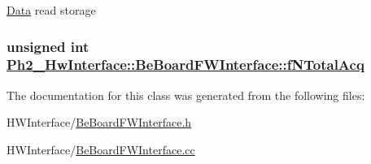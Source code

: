 \hyperlink{class_ph2___hw_interface_1_1_data}{Data} read storage \hypertarget{class_ph2___hw_interface_1_1_be_board_f_w_interface_9cc80365ec331732245553a8bc0024ab}{
\subsubsection[fNTotalAcq]{\setlength{\rightskip}{0pt plus 5cm}unsigned int \hyperlink{class_ph2___hw_interface_1_1_be_board_f_w_interface_9cc80365ec331732245553a8bc0024ab}{Ph2\_\-Hw\-Interface::Be\-Board\-FWInterface::f\-NTotal\-Acq}}}
\label{class_ph2___hw_interface_1_1_be_board_f_w_interface_9cc80365ec331732245553a8bc0024ab}




The documentation for this class was generated from the following files:\begin{CompactItemize}
\item 
HWInterface/\hyperlink{_be_board_f_w_interface_8h}{Be\-Board\-FWInterface.h}\item 
HWInterface/\hyperlink{_be_board_f_w_interface_8cc}{Be\-Board\-FWInterface.cc}\end{CompactItemize}
